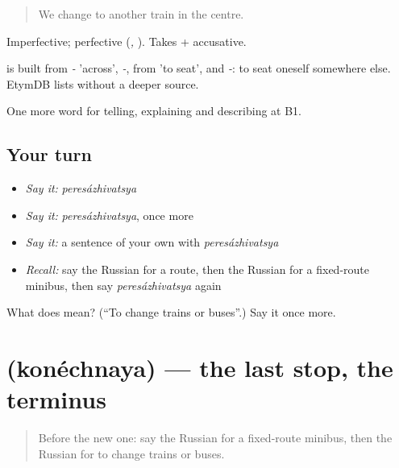 \begin{quote}
We change to another train in the centre.
\end{quote}

Imperfective; perfective \emph{} (\emph{, }). Takes \emph{} + accusative.

\begin{cousinweb}
\emph{} is built from \emph{-} 'across', \emph{-}, from \emph{} 'to seat', and \emph{-}: to seat oneself somewhere else. EtymDB lists \emph{} without a deeper source.
\end{cousinweb}

\begin{grammarlens}[title={What you've built}]
One more word for telling, explaining and describing at B1.
\end{grammarlens}

\subsection*{Your turn}
\begin{itemize}
\raggedright
  \item \emph{Say it:} \emph{peresázhivatsya}
  \item \emph{Say it:} \emph{peresázhivatsya}, once more
  \item \emph{Say it:} a sentence of your own with \emph{peresázhivatsya}
  \item \emph{Recall:} say the Russian for a route, then the Russian for a fixed-route minibus, then say \emph{peresázhivatsya} again
\end{itemize}

\begin{tcolorbox}[breakable,colback=teal!4,colframe=teal!35!black,title={Before you move on}]
What does  mean? (\textquotedblleft{}To change trains or buses\textquotedblright{}.) Say it once more.
\end{tcolorbox}
\section[\texorpdfstring{\ru{конечная} (konéchnaya)}{конечная (konéchnaya)}]{ (konéchnaya) — the last stop, the terminus}

\label{lesson:RU-C418-konechnaya}



\begin{quote}
Before the new one: say the Russian for a fixed-route minibus, then the Russian for to change trains or buses.
\end{quote}

